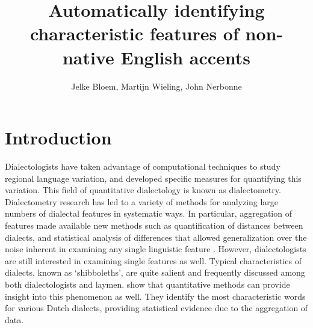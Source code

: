 \documentclass[output=paper]{LSP/langsci}
\author{Jelke Bloem, Martijn Wieling, John Nerbonne}
\title{Automatically identifying characteristic features of non-native English accents}
\begin{document}
 


 
\section{Introduction}

Dialectologists have taken advantage of computational techniques to study regional language variation, and developed specific measures for quantifying this variation. This field of quantitative dialectology is known as dialectometry. Dialectometry research has led to a variety of methods for analyzing large numbers of dialectal features in systematic ways. In particular, aggregation of features made available new methods such as quantification of distances between dialects, and statistical analysis of differences that allowed generalization over the noise inherent in examining any single linguistic feature \citep{nerbonne_data-driven_2009}. However, dialectologists are still interested in examining single features as well. Typical characteristics of dialects, known as `shibboleths', are quite salient and frequently discussed among both dialectologists and laymen. \citet{prokic_detecting_2012} show that quantitative methods can provide insight into this phenomenon as well. They identify the most characteristic words for various Dutch dialects, providing statistical evidence due to the aggregation of data.
\end{document}
